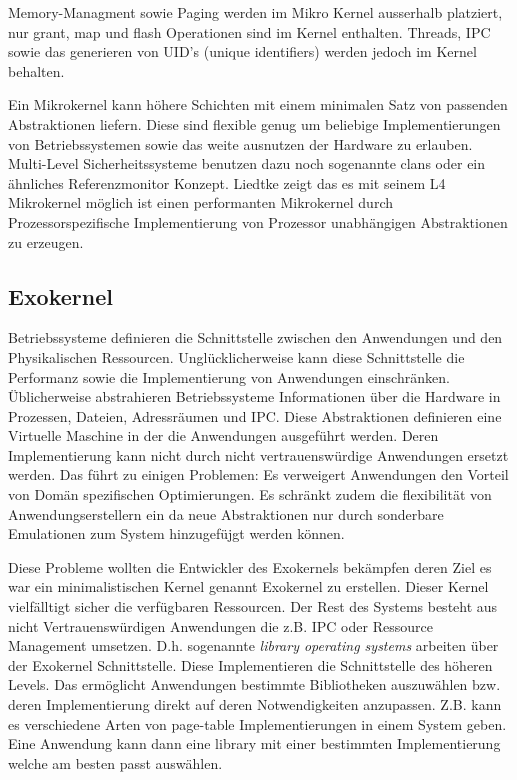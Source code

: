 \documentclass[9pt,technote]{IEEEtran}
\begin{document}
	    Memory-Managment sowie Paging werden im Mikro Kernel ausserhalb platziert, nur grant, map und flash Operationen sind im Kernel enthalten. \cite[S. 238 f]{inproc:micro}
	    Threads, IPC sowie das generieren von UID's (unique identifiers) werden jedoch im Kernel behalten.
	    
	    Ein Mikrokernel kann h\"ohere Schichten mit einem minimalen Satz von passenden Abstraktionen liefern.
	    Diese sind flexible genug um beliebige Implementierungen von Betriebssystemen sowie das weite ausnutzen der Hardware zu erlauben.
	    Multi-Level Sicherheitssysteme benutzen dazu noch sogenannte clans oder ein \"ahnliches Referenzmonitor Konzept.        
	    Liedtke zeigt das es mit seinem L4 Mikrokernel m\"oglich ist einen performanten Mikrokernel durch Prozessorspezifische Implementierung 
	    von Prozessor unabh\"angigen Abstraktionen zu erzeugen.\cite[S. 248]{inproc:micro}
   
    \subsection{Exokernel}       
       Betriebssysteme definieren die Schnittstelle zwischen den Anwendungen und den Physikalischen Ressourcen.
       Ungl\"ucklicherweise kann diese Schnittstelle die Performanz sowie die Implementierung von Anwendungen einschr\"anken. \"Ublicherweise
       abstrahieren Betriebssysteme Informationen \"uber die Hardware in Prozessen, Dateien, Adressr\"aumen und IPC. Diese Abstraktionen definieren eine 
       Virtuelle Maschine in der die Anwendungen ausgef\"uhrt werden. Deren Implementierung kann nicht durch nicht vertrauensw\"urdige Anwendungen ersetzt werden.
        Das f\"uhrt zu einigen Problemen: Es verweigert Anwendungen den Vorteil von Dom\"an spezifischen Optimierungen. Es schr\"ankt zudem die flexibilit\"at von
        Anwendungserstellern ein da neue Abstraktionen nur durch sonderbare Emulationen zum System hinzugef\"ujgt werden k\"onnen.
        
        Diese Probleme wollten die Entwickler des Exokernels bek\"ampfen deren Ziel es war ein minimalistischen Kernel genannt Exokernel zu erstellen.
        Dieser Kernel vielf\"alltigt sicher die verf\"ugbaren Ressourcen. Der Rest des Systems besteht aus nicht Vertrauensw\"urdigen Anwendungen die
        z.B. IPC oder Ressource Management umsetzen. D.h. sogenannte \textit{library operating systems} arbeiten \"uber der Exokernel Schnittstelle. 
        Diese Implementieren die Schnittstelle des h\"oheren Levels. Das erm\"oglicht Anwendungen bestimmte Bibliotheken auszuw\"ahlen bzw.
        deren Implementierung direkt auf deren Notwendigkeiten anzupassen. Z.B. kann es verschiedene Arten von page-table Implementierungen
        in einem System geben. Eine Anwendung kann dann eine library mit einer bestimmten Implementierung welche am besten passt ausw\"ahlen.
        
\end{document}
